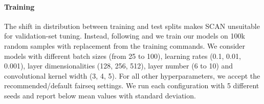 \paragraph{Training} The shift in distribution between training and
test splits makes SCAN unsuitable for validation-set tuning. Instead,
following  and  we
train our models on 100k random samples with replacement from the
training commands. We consider models with different batch sizes (from
25 to 100), learning rates (0.1, 0.01, 0.001), layer dimensionalities
(128, 256, 512), layer number (6 to 10) and convolutional kernel width
(3, 4, 5). For all other hyperparameters, we accept the
recommended/default fairseq settings. We run each configuration with
5 different seeds and report below mean values with standard
deviation.




